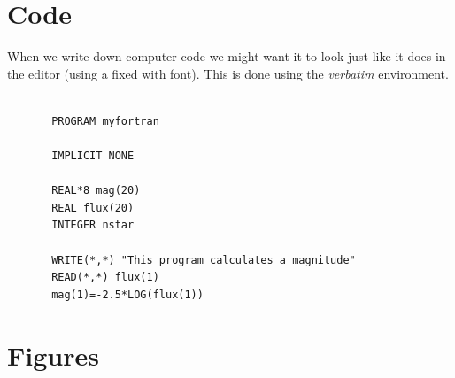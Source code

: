 \documentclass[12pt]{report}
\begin{document}
\section{Code}

When we write down computer code we might want it to look just like it does in
the editor (using a fixed with font). This is done using the {\sl verbatim}
environment.

\begin{verbatim}

       PROGRAM myfortran

       IMPLICIT NONE

       REAL*8 mag(20)
       REAL flux(20)
       INTEGER nstar

       WRITE(*,*) "This program calculates a magnitude"
       READ(*,*) flux(1)
       mag(1)=-2.5*LOG(flux(1))

\end{verbatim}

\section{Figures}
\end{document}
